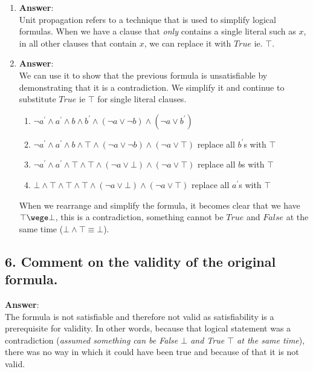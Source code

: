 \documentclass[a4paper, 14pt]{report}
\newcommand{\answer}[1]{%
	\begin{flushleft}
		\textbf{Answer}:\\
			#1
	\end{flushleft}}
\newcommand{\question}[1]{\subsection*{#1}}
\begin{document}
\begin{enumerate}		

	\item \answer{%
			Unit propagation refers to a technique that is used to simplify
			logical formulas.
			When we have a clause that \textit{only} contains a single literal
			such as $ x $, in all other clauses that contain $ x $, we can
			replace it with $ True $ ie. $\top$.\\ }


	\item \answer{We can use it to show that the previous formula is
		unsatisfiable by demonstrating that it is a contradiction.
		We simplify it and continue to substitute $True$
		ie $\top$ for single literal clauses.

		\begin{enumerate}		
			\item $ \neg a^\prime \wedge a^\prime \wedge b \wedge b^\prime \wedge (\neg a \vee \neg b)  \wedge (\neg a \vee b^\prime) $ 
			\item $ \neg a^\prime \wedge a^\prime \wedge b \wedge \top \wedge (\neg a \vee \neg b)  \wedge (\neg a \vee \top) $ replace all $b^\prime$s with $\top$  \\
			\item $ \neg a^\prime \wedge a^\prime \wedge \top \wedge \top \wedge (\neg a \vee \bot)  \wedge (\neg a \vee \top) $ replace all $b$s with $\top$  \\
			\item $ \bot \wedge \top \wedge \top \wedge \top \wedge (\neg a \vee \bot)  \wedge (\neg a \vee \top) $ replace all $a^\prime$s with $\top$  \\
		\end{enumerate}			

		When we rearrange and simplify the formula, it becomes clear that we have 
	  $\top \wege \bot$, this is a contradiction, something cannot be $True$ and $False$ at the same time ($\bot \wedge \top \equiv \bot$).}

\end{enumerate}		

\question{6. Comment on the validity of the original formula.} 

\answer{The formula is not satisfiable and therefore not valid as satisfiability is
	a prerequisite for validity. In other words, because that logical statement
	was a contradiction (\textit{assumed something can be False $\bot$ and True $\top$ at the same time}), there was no way in which it could have been true and
	because of that it is not valid.}
\end{document}
